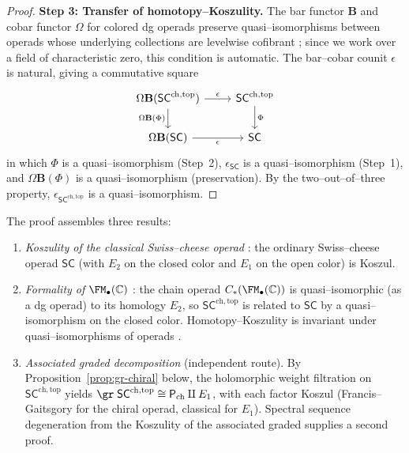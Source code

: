 \begin{proof}
\textbf{Step 3: Transfer of homotopy--Koszulity.}
The bar functor $\mathbf{B}$ and cobar functor $\Omega$ for colored dg
operads preserve quasi--isomorphisms between operads whose underlying
collections are levelwise cofibrant \cite{BM03,GK94}; since we work over
a field of characteristic zero, this condition is automatic. The
bar--cobar counit $\epsilon$ is natural, giving a commutative square
\[
\begin{tikzcd}
\Omega\mathbf{B}(\mathsf{SC}^{\mathrm{ch,top}}) \ar[r, "\epsilon"] \ar[d, "\Omega\mathbf{B}(\Phi)"'] & \mathsf{SC}^{\mathrm{ch,top}} \ar[d, "\Phi"] \\
\Omega\mathbf{B}(\mathsf{SC}) \ar[r, "\epsilon"'] & \mathsf{SC}
\end{tikzcd}
\]
in which $\Phi$ is a quasi--isomorphism (Step~2),
$\epsilon_{\mathsf{SC}}$ is a quasi--isomorphism (Step~1), and
$\Omega\mathbf{B}(\Phi)$ is a quasi--isomorphism (preservation). By the
two--out--of--three property,
$\epsilon_{\mathsf{SC}^{\mathrm{ch,top}}}$ is a quasi--isomorphism.
\end{proof}

\begin{remark}
\label{rmk:hKoszul-evidence}
The proof assembles three results:
\begin{enumerate}[label=(\roman*)]
\item \emph{Koszulity of the classical Swiss--cheese operad}
 \cite{Hoe09,HL12}: the ordinary Swiss--cheese operad
 $\mathsf{SC}$ (with $E_2$ on the closed color and $E_1$ on the open
 color) is Koszul.
\item \emph{Formality of $\FM_\bullet(\mathbb C)$}
 \cite{Kon03}: the chain operad $C_\ast(\FM_\bullet(\mathbb C))$ is
 quasi--isomorphic (as a dg operad) to its homology $E_2$, so
 $\mathsf{SC}^{\mathrm{ch,top}}$ is related to $\mathsf{SC}$ by a
 quasi--isomorphism on the closed color. Homotopy--Koszulity is
 invariant under quasi--isomorphisms of operads \cite{Val07}.
\item \emph{Associated graded decomposition} (independent route). By
 Proposition~\ref{prop:gr-chiral} below, the holomorphic weight
 filtration on $\mathsf{SC}^{\mathrm{ch,top}}$ yields
 $\gr\;\mathsf{SC}^{\mathrm{ch,top}}\cong \mathsf P_{\mathrm{ch}}\amalg E_1$,
 with each factor Koszul (Francis--Gaitsgory \cite{FG12} for the
 chiral operad, classical for $E_1$). Spectral sequence degeneration
 from the Koszulity of the associated graded supplies a second proof.
\end{enumerate}
\end{remark}

